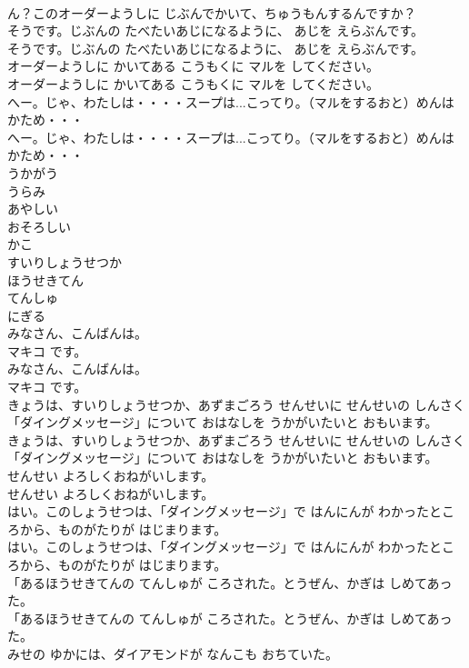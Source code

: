 \documentclass[8pt]{extreport}
\begin{document}
\begin{CJK}{UTF8}{min}
\\	ん？このオーダーようしに じぶんでかいて、ちゅうもんするんですか？
\\	そうです。じぶんの たべたいあじになるように、 あじを えらぶんです。
\\	そうです。じぶんの たべたいあじになるように、 あじを えらぶんです。
\\	オーダーようしに かいてある こうもくに マルを してください。
\\	オーダーようしに かいてある こうもくに マルを してください。
\\	へー。じゃ、わたしは・・・・スープは...こってり。（マルをするおと）めんは かため・・・
\\	へー。じゃ、わたしは・・・・スープは...こってり。（マルをするおと）めんは かため・・・
\\	うかがう
\\	うらみ
\\	あやしい
\\	おそろしい
\\	かこ
\\	すいりしょうせつか
\\	ほうせきてん
\\	てんしゅ
\\	にぎる
\\	みなさん、こんばんは。
\\	マキコ です。
\\	みなさん、こんばんは。
\\	マキコ です。
\\	きょうは、すいりしょうせつか、あずまごろう せんせいに せんせいの しんさく「ダイングメッセージ」について おはなしを うかがいたいと おもいます。
\\	きょうは、すいりしょうせつか、あずまごろう せんせいに せんせいの しんさく「ダイングメッセージ」について おはなしを うかがいたいと おもいます。
\\	せんせい よろしくおねがいします。
\\	せんせい よろしくおねがいします。
\\	はい。このしょうせつは、「ダイングメッセージ」で はんにんが わかったところから、ものがたりが はじまります。
\\	はい。このしょうせつは、「ダイングメッセージ」で はんにんが わかったところから、ものがたりが はじまります。
\\	「あるほうせきてんの てんしゅが ころされた。とうぜん、かぎは しめてあった。
\\	「あるほうせきてんの てんしゅが ころされた。とうぜん、かぎは しめてあった。
\\	みせの ゆかには、ダイアモンドが なんこも おちていた。

\end{CJK}
\end{document}
